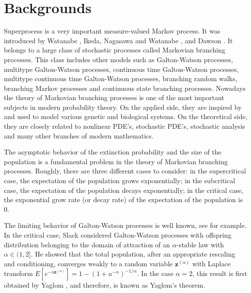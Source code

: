 \documentclass[UTF8]{pkuthss}
\theoremstyle{plain}
\theoremstyle{definition}
\numberwithin{equation}{section}
\begin{document}
\section{Backgrounds}
    Superprocess is a very important measure-valued Markov process. 
    It was introduced by Watanabe \cite{Watanabe1968Limit}, Ikeda, Nagasawa and Watanabe \cite{IkedaNagasawaWatanabe1968Branchinga,IkedaNagasawaWatanabe1968Branching,IkedaNagasawaWatanabe1969Branching}, and Dawson \cite{Dawson1975Stochastic,Dawson1977Critical}. 
    It belongs to a large class of stochastic processes called Markovian branching processes. 
    This class includes other models such as Galton-Watson processes, multitype Galton-Watson processes, continuous time Galton-Watson processes, multitype continuous time Galton-Watson processes, branching random walks, branching Markov processes and continuous state branching processes.
    Nowadays the theory of Markovian branching processes is one of the most important subjects in modern probability theory.
    On the applied side, they are inspired by and used to model various genetic and biological systems. 
    On the theoretical side, they are closely related to nonlinear PDE's, stochastic PDE's, stochastic analysis and many other branches of modern mathematics.

    The asymptotic behavior of the extinction probability and the size of the population is a fundamental problem in the theory of Markovian branching processes. 
    Roughly, there are three different cases to consider: in the supercritical case, the expectation of the population grows exponentially; in the subcritical case, the expectation of the population decays exponentially; in the critical case, the exponential grow rate (or decay rate) of the expectation of the population is $0$.

    The limiting behavior of Galton-Watson processes is well known, see \cite{AthreyaNey1972Branching} for example. 
    In the critical case, Slack \cite{Slack1968Branching} considered Galton-Watson processes with offspring distribution belonging to the domain of attraction of an $\alpha$-stable law with $\alpha \in (1,2]$. 
    He showed that the total population, after an appropriate rescaling and conditioning, converges weakly to a random variable $\mathbf z^{(\alpha)}$ with Laplace transform $E[e^{-u\mathbf z^{(\alpha)}}] = 1-(1+u^{-\alpha})^{-1/\alpha}$. 
    In the case $\alpha = 2$, this result is first obtained by Yaglom \cite{Yaglom1947Certain}, and therefore, is known as Yaglom's theorem.
    
\end{document}
